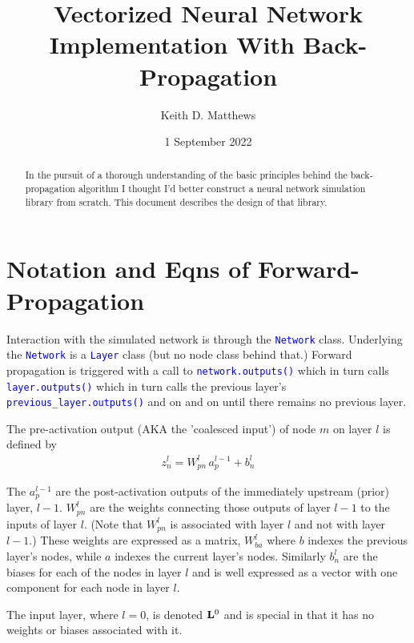 \documentclass[twocolumn]{revtex4-1}
\newcommand{\code}[1]{\textcolor{blue}{\lstinline{#1}}}
\newcommand{\bld}[1]{\vectorbold{#1}}
\begin{document}
\title{Vectorized Neural Network Implementation With Back-Propagation}
\author{Keith D. Matthews}

\date{1 September 2022}

\begin{abstract}
In the pursuit of a thorough understanding of the basic principles behind the back-propagation algorithm I thought I'd better construct a neural network simulation library from scratch. This document describes the design of that library.
\end{abstract}

\maketitle


\section{Notation and Eqns of Forward-Propagation}

Interaction with the simulated network is through the \code{Network} class. Underlying the \code{Network} is a  \code{Layer} class (but no node class behind that.) Forward propagation is triggered with a call to \code{network.outputs()} which in turn calls \code{layer.outputs()} which in turn calls the previous layer's \code{previous_layer.outputs()} and on and on until there remains no previous layer.

The pre-activation output (AKA the 'coalesced input') of node $m$ on layer $l$ is defined by
\begin{align}
    \label{eqn:componentCoalescence}
    z^l_n = W^l_{p n} \, a^{l - 1}_p + b^{l}_n
\end{align}

The $a^{l - 1}_p$ are the post-activation outputs of the immediately upstream (prior) layer, $l-1$. $W^l_{p n}$ are the weights connecting those outputs of layer $l - 1$ to the inputs of layer $l$. (Note that $W^l_{p n}$ is associated with layer $l$ and not with layer $l-1$.) These weights are expressed as a matrix, $W^l_{b a}$ where $b$ indexes the previous layer's nodes, while $a$ indexes the current layer's nodes. Similarly $b^l_n$ are the biases for each of the nodes in layer $l$ and is well expressed as a vector with one component for each node in layer $l$.

The input layer, where $l = 0$, is denoted $\bld{L}^0$ and is special in that it has no weights or biases associated with it.
\end{document}
